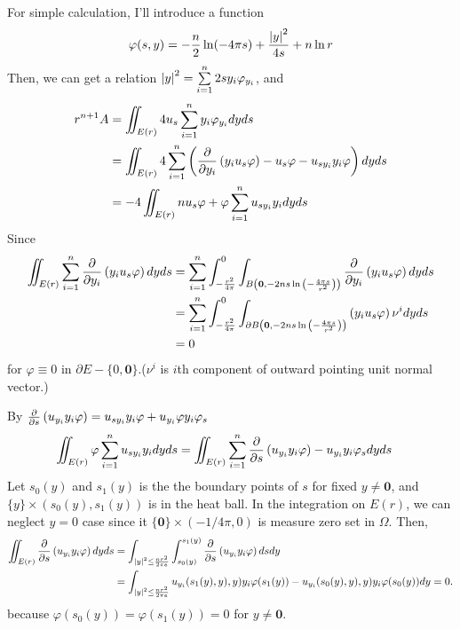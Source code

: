 \documentclass{article}
\begin{document}
For simple calculation, I'll introduce a function
\begin{equation*}
\varphi(s, y)= -\frac{n}{2}\ln(-4\pi s)+\frac{\abs{y}^2}{4s}+n\ln r
\end{equation*}
Then, we can get a relation $\abs{y}^2=\sum\limits_{i=1}^n 2sy_i\varphi_{y_i}$, and
\begin{equation*}
\begin{split}
r^{n+1}A&=\iint_{E(r)} 4u_s \sum\limits_{i=1}^n y_i \varphi_{y_i} dyds \\
&=\iint_{E(r)} 4 \sum\limits_{i=1}^n \left(\pdv{y_i}\left(y_iu_s\varphi\right)-u_s\varphi-u_{sy_i}y_i\varphi\right) dyds \\
&=-4\iint_{E(r)} nu_s\varphi + \varphi\sum\limits_{i=1}^n u_{sy_i} y_i  dyds
\end{split}
\end{equation*}
Since
\begin{equation*}
\begin{split}
\iint_{E(r)} \sum\limits_{i=1}^n \pdv{y_i}\left(y_i u_s\varphi\right) dyds&=\sum\limits_{i=1}^n \int_{-\frac{r^2}{4\pi}}^0 \int_{B\left(\bm{0}, -2ns \ln{\left(-\frac{4\pi s}{r^2}\right)}\right)}  \pdv{y_i}\left(y_i u_s\varphi\right) dyds \\
&=\sum\limits_{i=1}^n \int_{-\frac{r^2}{4\pi}}^0 \int_{\partial B\left(\bm{0}, -2ns \ln{\left(-\frac{4\pi s}{r^2}\right)}\right)}  \left(y_i u_s\varphi\right)\nu^i dyds \\
&=0
\end{split}
\end{equation*}
for $\varphi\equiv 0$ in $\partial E-\{0,\bm{0}\}$.($\nu^i$ is $i$th component of outward pointing unit normal vector.)

By $\pdv{s}\left(u_{y_i}y_i\varphi\right)=u_{sy_i}y_i\varphi+u_{y_i}\varphi y_i \varphi_s$ 
\begin{equation*}
\begin{split}
\iint_{E(r)} \varphi\sum\limits_{i=1}^n u_{sy_i} y_i  dyds&=\iint_{E(r)} \sum\limits_{i=1}^n \pdv{s}\left(u_{y_i}y_i\varphi\right) - u_{y_i}y_i \varphi_s dyds
\end{split}
\end{equation*}
Let $s_0(y)$ and $s_1(y)$ is the the boundary points of $s$ for fixed $y\neq \bm{0}$, and $\{y\}\times(s_0(y),s_1(y))$ is in the heat ball. In the integration on $E(r)$, we can neglect $y=0$ case since it $\{\bm{0}\}\times(-1/4\pi, 0)$ is measure zero set in $\Omega$. Then,
\begin{equation*}
\begin{split}
\iint_{E(r)}\pdv{s}\left(u_{y_i}y_i\varphi\right)dyds&=\int_{\abs{y}^2\leq\frac{nr^2}{2\pi e}}\int_{s_0(y)}^{s_1(y)}\pdv{s}\left(u_{y_i}y_i\varphi\right)dsdy \\
&=\int_{\abs{y}^2\leq\frac{nr^2}{2\pi e}}u_{y_i}(s_1(y), y), y)y_i\varphi(s_1(y))-u_{y_i}(s_0(y), y), y)y_i\varphi(s_0(y))dy=0.
\end{split}
\end{equation*}
because $\varphi(s_0(y))=\varphi(s_1(y))=0$ for $y\neq \bm{0}$.
\end{document}
